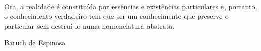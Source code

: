 \null\
\vfill

\hfill \parbox{9.0cm} {\noindent Ora, a realidade é constituída por essências e existências particulares e, portanto, o conhecimento verdadeiro tem que ser um conhecimento que preserve o particular sem destruí-lo numa nomenclatura abstrata. 


\vspace{0.5cm}

\noindent Baruch de Espinosa}
\setcounter{page}{2}  %

